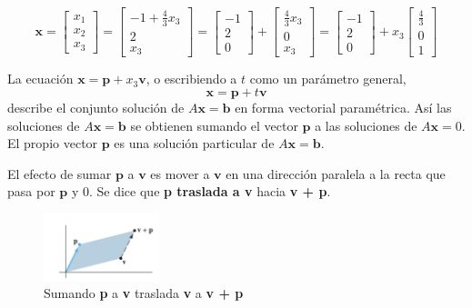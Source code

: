 \documentclass{article}
\begin{document}
\begin{equation*}
    \mathbf{x} = \left[\begin{array}{c}
        x_1\\
        x_2\\
        x_3
    \end{array}\right]
    = \left[\begin{array}{c}
        -1 + \frac{4}{3}x_3\\
        2\\
        x_3
    \end{array}\right] 
    = \left[\begin{array}{c}
        -1\\
        2\\
        0
    \end{array}\right]
    + \left[\begin{array}{c}
        \frac{4}{3}x_3\\
        0\\
        x_3
    \end{array}\right]
    = \left[\begin{array}{c}
        -1\\
        2\\
        0
    \end{array}\right]
    +  x_3 \left[\begin{array}{c}
        \frac{4}{3}\\
        0\\
        1
    \end{array}\right]
\end{equation*}

La ecuación $\mathbf{x} = \mathbf{p} + x_3\mathbf{v}$, o escribiendo a $t$ como un parámetro general, $$\mathbf{x} = \mathbf{p} + t\mathbf{v}$$ describe el conjunto solución de $A\mathbf{x} = \mathbf{b}$ en forma vectorial paramétrica. Así las soluciones de $A\mathbf{x} = \mathbf{b}$ se obtienen sumando el vector $\mathbf{p}$ a las soluciones de $A\mathbf{x} = 0$. El propio vector $\mathbf{p}$ es una solución particular de $A\mathbf{x} = \mathbf{b}$.

El efecto de sumar $\mathbf{p}$ a $\mathbf{v}$ es mover a $\mathbf{v}$ en una dirección paralela a la recta que pasa por $\mathbf{p}$ y 0. Se dice que \textbf{p traslada a v} hacia \textbf{v + p}.

\begin{figure}[ht]
    \centerline{\includegraphics[width=0.3\textwidth]{img/image12.png}}
    \caption{Sumando \textbf{p} a \textbf{v} traslada \textbf{v} a \textbf{v + p}}
  \end{figure}
\end{document}

